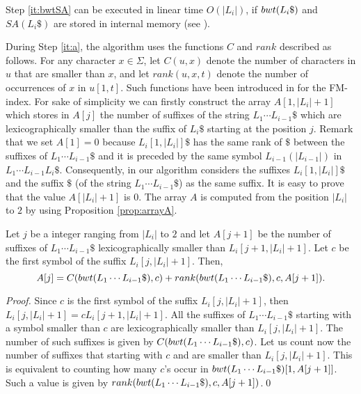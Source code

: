 \documentclass[envcountsame,runningheads]{llncs}
\begin{document}
Step \ref{it:bwtSA} can be executed in linear time $O(|L_i|)$, if ${bwt}(L_{i}\$)$ and $SA(L_{i}\$)$ are stored in internal memory (see \cite{Puglisi:2007,GrossiSurvey2011}).

During Step \ref{it:a}, the algorithm uses the functions $C$ and $rank$ described as follows.
For any character $x \in \Sigma$, let $C(u,x)$ denote the number of characters in $u$ that are smaller than $x$, and let $rank(u, x, t)$ denote the number of occurrences of $x$ in $u[1,t]$. Such functions have been introduced in \cite{Ferragina:2000} for the FM-index. For sake of simplicity we can firstly construct the array $A[1, |L_{i}|+1]$ which stores in $A[j]$ the number of suffixes of the string $L_1 \cdots L_{i-1}\$$ which are lexicographically smaller than the suffix of $L_{i}\$$ starting at the position $j$.
Remark that we set $A[1]=0$ because $L_i[1,|L_i|]\$$ has the same rank of $\$$ between the suffixes of $L_1 \cdots L_{i-1}\$$ and it is preceded by the same symbol $L_{i-1}(|L_{i-1}|)$ in $L_1\cdots L_{i-1}L_i\$$. Consequently, in our algorithm considers the suffixes $L_i[1,|L_i|]\$$ and the suffix $\$$ (of the string $L_1 \cdots L_{i-1}\$$) as the same suffix.
It is easy to prove that the value $A[|L_i|+1]$ is $0$.
The array $A$ is computed from the position $|L_i|$ to $2$ by using Proposition \ref{prop:arrayA}.

\begin{proposition}\label{prop:arrayA}
Let $j$ be a integer ranging from $|L_i|$ to $2$ and let $A[j+1]$ be the number of suffixes of $L_1 \cdots L_{i-1}\$$ lexicographically smaller than $L_i[j+1,|L_i|+1]$. Let $c$ be the first symbol of the suffix $L_i[j,|L_i|+1]$. Then, $$A[j]=C({bwt}(L_1 \cdots L_{i-1}\$),c)+rank({bwt}(L_1 \cdots L_{i-1}\$),c,A[j+1]).$$
\end{proposition}
\begin{proof}

Since $c$ is the first symbol of the suffix $L_i[j,|L_i|+1]$, then $L_i[j,|L_i|+1]=cL_i[j+1,|L_i|+1]$. All the suffixes of $L_1 \cdots L_{i-1}\$$ starting with a symbol smaller than $c$ are lexicographically smaller than $L_i[j,|L_i|+1]$. The number of such suffixes is given by $C({bwt}(L_1 \cdots L_{i-1}\$),c)$. Let us count now the number of suffixes that starting with $c$ and are smaller than $L_i[j,|L_i|+1]$. This is equivalent to counting how many $c$'s occur in ${bwt}(L_1 \cdots L_{i-1}\$)[1,A[j+1]]$. Such a value is given by $rank({bwt}(L_1 \cdots L_{i-1}\$),c,A[j+1])$.\qed
\end{proof}
\end{document}
